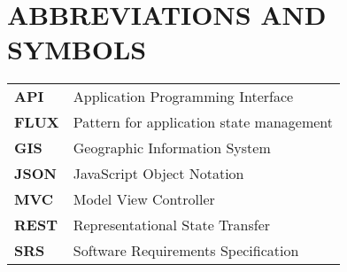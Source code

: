 \section*{ABBREVIATIONS AND SYMBOLS}

\begin{tabular}{l l}

\textbf{API} & Application Programming Interface\\
\textbf{FLUX} & Pattern for application state management\\
\textbf{GIS} & Geographic Information System\\
\textbf{JSON} & JavaScript Object Notation \\
\textbf{MVC} & Model View Controller\\
\textbf{REST} & Representational State Transfer\\
\textbf{SRS} & Software Requirements Specification\\

\end{tabular}